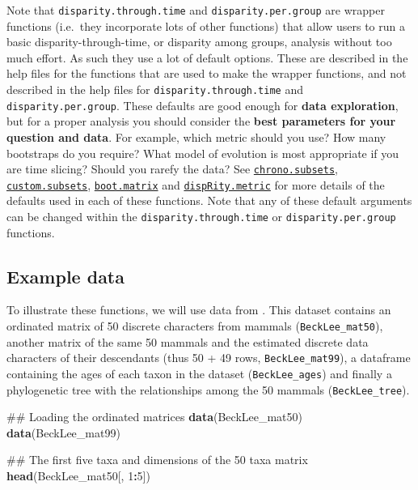 \documentclass[]{book}
\newenvironment{Shaded}{\begin{snugshade}}{\end{snugshade}}
\newcommand{\KeywordTok}[1]{\textcolor[rgb]{0.13,0.29,0.53}{\textbf{#1}}}
\newcommand{\DecValTok}[1]{\textcolor[rgb]{0.00,0.00,0.81}{#1}}
\newcommand{\OperatorTok}[1]{\textcolor[rgb]{0.81,0.36,0.00}{\textbf{#1}}}
\newcommand{\NormalTok}[1]{#1}
\theoremstyle{definition}
\theoremstyle{definition}
\theoremstyle{remark}
\begin{document}
Note that \texttt{disparity.through.time} and
\texttt{disparity.per.group} are wrapper functions (i.e.~they
incorporate lots of other functions) that allow users to run a basic
disparity-through-time, or disparity among groups, analysis without too
much effort. As such they use a lot of default options. These are
described in the help files for the functions that are used to make the
wrapper functions, and not described in the help files for
\texttt{disparity.through.time} and \texttt{disparity.per.group}. These
defaults are good enough for \textbf{data exploration}, but for a proper
analysis you should consider the \textbf{best parameters for your
question and data}. For example, which metric should you use? How many
bootstraps do you require? What model of evolution is most appropriate
if you are time slicing? Should you rarefy the data? See
\protect\hyperlink{time-slicing}{\texttt{chrono.subsets}},
\protect\hyperlink{customised-subsets}{\texttt{custom.subsets}},
\protect\hyperlink{bootstraps-and-rarefactions}{\texttt{boot.matrix}}
and \protect\hyperlink{disparity-metrics}{\texttt{dispRity.metric}} for
more details of the defaults used in each of these functions. Note that
any of these default arguments can be changed within the
\texttt{disparity.through.time} or \texttt{disparity.per.group}
functions.

\hypertarget{example-data}{\subsection{Example
data}\label{example-data}}

To illustrate these functions, we will use data from
\citet{beckancient2014}. This dataset contains an ordinated matrix of 50
discrete characters from mammals (\texttt{BeckLee\_mat50}), another
matrix of the same 50 mammals and the estimated discrete data characters
of their descendants (thus 50 + 49 rows, \texttt{BeckLee\_mat99}), a
dataframe containing the ages of each taxon in the dataset
(\texttt{BeckLee\_ages}) and finally a phylogenetic tree with the
relationships among the 50 mammals (\texttt{BeckLee\_tree}).

\begin{Shaded}
\begin{Highlighting}[]
\NormalTok{## Loading the ordinated matrices}
\KeywordTok{data}\NormalTok{(BeckLee_mat50)}
\KeywordTok{data}\NormalTok{(BeckLee_mat99)}

\NormalTok{## The first five taxa and dimensions of the 50 taxa matrix}
\KeywordTok{head}\NormalTok{(BeckLee_mat50[, }\DecValTok{1}\OperatorTok{:}\DecValTok{5}\NormalTok{])}
\end{Highlighting}
\end{Shaded}
\end{document}
